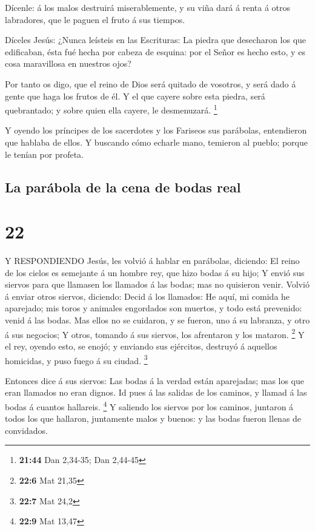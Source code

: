  Dícenle: á los malos destruirá miserablemente, y su viña
dará á renta á otros labradores, que le paguen el fruto á sus tiempos.

 Díceles Jesús: ¿Nunca leísteis en las Escrituras: La
piedra que desecharon los que edificaban, ésta fué hecha por cabeza de
esquina: por el Señor es hecho esto, y es cosa maravillosa en nuestros
ojos?

 Por tanto os digo, que el reino de Dios será quitado de
vosotros, y será dado á gente que haga los frutos de él.  Y
el que cayere sobre esta piedra, será quebrantado; y sobre quien ella
cayere, le desmenuzará. \footnote{\textbf{21:44} Dan 2,34-35; Dan
  2,44-45}

 Y oyendo los príncipes de los sacerdotes y los Fariseos
sus parábolas, entendieron que hablaba de ellos.  Y
buscando cómo echarle mano, temieron al pueblo; porque le tenían por
profeta.

\hypertarget{la-paruxe1bola-de-la-cena-de-bodas-real}{%
\subsection{La parábola de la cena de bodas
real}\label{la-paruxe1bola-de-la-cena-de-bodas-real}}

\hypertarget{section-21}{%
\section{22}\label{section-21}}

 Y RESPONDIENDO Jesús, les volvió á hablar en parábolas,
diciendo:  El reino de los cielos es semejante á un hombre
rey, que hizo bodas á su hijo;  Y envió sus siervos para que
llamasen los llamados á las bodas; mas no quisieron venir. 
Volvió á enviar otros siervos, diciendo: Decid á los llamados: He aquí,
mi comida he aparejado; mis toros y animales engordados son muertos, y
todo está prevenido: venid á las bodas.  Mas ellos no se
cuidaron, y se fueron, uno á su labranza, y otro á sus negocios;
 Y otros, tomando á sus siervos, los afrentaron y los
mataron. \footnote{\textbf{22:6} Mat 21,35}  Y el rey,
oyendo esto, se enojó; y enviando sus ejércitos, destruyó á aquellos
homicidas, y puso fuego á su ciudad. \footnote{\textbf{22:7} Mat 24,2}

 Entonces dice á sus siervos: Las bodas á la verdad están
aparejadas; mas los que eran llamados no eran dignos.  Id
pues á las salidas de los caminos, y llamad á las bodas á cuantos
hallareis. \footnote{\textbf{22:9} Mat 13,47}  Y saliendo
los siervos por los caminos, juntaron á todos los que hallaron,
juntamente malos y buenos: y las bodas fueron llenas de convidados.

